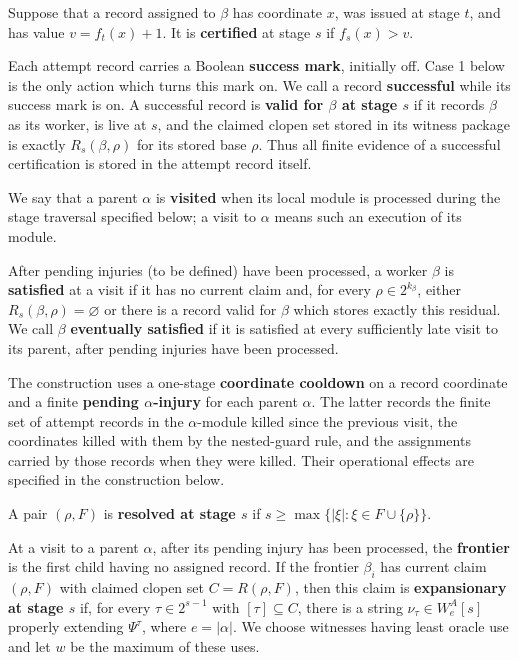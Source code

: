 \documentclass[10pt,a4paper]{amsart}
\begin{document}
Suppose that a record assigned to $\beta$ has coordinate $x$, was issued at
stage $t$, and has value $v=f_t(x)+1$. It is \textbf{certified} at stage $s$
if $f_s(x)>v$.

Each attempt record carries a Boolean \textbf{success mark}, initially off.
Case 1 below is the only action which turns this mark on. We call a record
\textbf{successful} while its success mark is on. A successful record is
\textbf{valid for $\beta$ at stage $s$} if it records $\beta$ as its worker,
is live at $s$, and the claimed clopen set stored in its witness package is
exactly $R_s(\beta,\rho)$ for its stored base $\rho$.
Thus all finite evidence of a successful certification is stored in the
attempt record itself.

We say that a parent $\alpha$ is \textbf{visited} when its local module is
processed during the stage traversal specified below; a visit to $\alpha$
means such an execution of its module.

After pending injuries (to be defined) have been processed, a worker $\beta$ is
\textbf{satisfied} at a visit if it has no current claim and, for every
$\rho\in2^{k_\beta}$, either $R_s(\beta,\rho)=\varnothing$ or there is a
record valid for $\beta$ which stores exactly this residual. We call $\beta$
\textbf{eventually satisfied} if it is satisfied at every sufficiently late
visit to its parent, after pending injuries have been processed.

The construction uses a one-stage \textbf{coordinate cooldown} on a record
coordinate and a finite \textbf{pending $\alpha$-injury} for each parent
$\alpha$. The latter records
the finite set of attempt records in the $\alpha$-module killed since the
previous visit, the coordinates killed with them by the nested-guard rule,
and the assignments carried by those records when they were killed. Their
operational effects are specified in the construction below. 

A pair $(\rho,F)$ is
\textbf{resolved at stage $s$} if
$s\geq\max\{|\xi|:\xi\in F\cup\{\rho\}\}$.

At a visit to a parent $\alpha$, after its pending injury has been processed,
the \textbf{frontier} is the first child having no assigned record. If the
frontier $\beta_i$ has current claim $(\rho,F)$ with claimed clopen set
$C=R(\rho,F)$, then this claim is \textbf{expansionary at stage $s$} if, for
every $\tau\in2^{s-1}$ with $[\tau]\subseteq C$, there is a string $\nu_\tau\in W_e^A[s]$ properly extending $\Psi^\tau$, where $e=|\alpha|$.
We choose witnesses having least oracle use and let $w$ be the maximum of
these uses.
\end{document}
